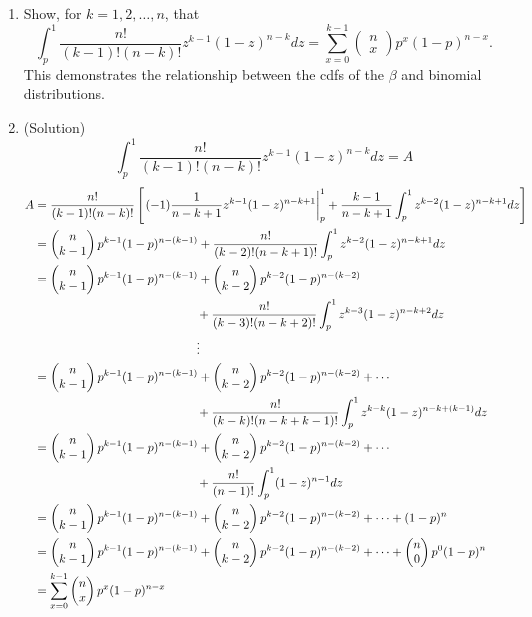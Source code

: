 \documentclass{oblivoir}
\newcommand{\mat}[2]{\begin{pmatrix} #1 \\ #2 \end{pmatrix}}
\begin{document}
\begin{enumerate}
\item
Show, for $k = 1,2,\ldots,n$, that
$$
\int_p^1 \frac{n!}{(k-1)! (n-k)!} z^{k-1} (1-z)^{n-k} dz = \sum_{x=0}^{k-1} \mat{n}{x} p^x(1-p)^{n-x}.
$$
This demonstrates the relationship between the cdfs of the $\beta$ and binomial distributions.

\item[] (Solution)
$$
\int_p^1 \frac{n!}{(k-1)! (n-k)!} z^{k-1} (1-z)^{n-k} dz = A
$$
\begin{align*}
A &= \frac{n!}{(k-1)! (n-k)!} \left[ \left. (-1) \frac{1}{n-k+1} z^{k-1} (1-z)^{n-k+1}\right \vert_{p}^{1} + \frac{k-1}{n-k+1} \int_p^1 z^{k-2} (1-z)^{n-k+1} dz \right] \\
&= \mat{n}{k-1} p^{k-1} (1-p)^{n-(k-1)} + \frac{n!}{(k-2)! (n-k+1)!} \int_p^1 z^{k-2} (1-z)^{n-k+1} dz \\
&= \mat{n}{k-1} p^{k-1} (1-p)^{n-(k-1)} + \mat{n}{k-2} p^{k-2} (1-p)^{n-(k-2)} \\
& \hphantom{{} + \mat{n}{k-2} p^{k-2} (1-p)^{n-(k-2)}} + \frac{n!}{(k-3)! (n-k+2)!} \int_p^1 z^{k-3} (1-z)^{n-k+2} dz \\
&\hphantom{{} +  \mat{n}{k-2} p^{k-2} (1-p)^{n-(k-2)}} \vdots\\
&= \mat{n}{k-1} p^{k-1} (1-p)^{n-(k-1)} + \mat{n}{k-2} p^{k-2} (1-p )^{n-(k-2)} + \cdots \\
& \hphantom{{} + \mat{n}{k-2} p^{k-2} (1-p)^{n-(k-2)}} + \frac{n!}{(k-k)!(n-k+k-1)!} \int_p^1 z^{k-k} (1-z)^{n-k+(k-1)}dz\\
&= \mat{n}{k-1} p^{k-1} (1-p)^{n-(k-1)} + \mat{n}{k-2} p^{k-2} (1-p )^{n-(k-2)} + \cdots \\
& \hphantom{{} + \mat{n}{k-2} p^{k-2} (1-p)^{n-(k-2)}} + \frac{n!}{(n-1)!} \int_p^1 (1-z)^{n-1}dz\\
&= \mat{n}{k-1} p^{k-1} (1-p)^{n-(k-1)} + \mat{n}{k-2} p^{k-2} (1-p )^{n-(k-2)} + \cdots + (1-p)^n\\
&= \mat{n}{k-1} p^{k-1} (1-p)^{n-(k-1)} + \mat{n}{k-2} p^{k-2} (1-p)^{n-(k-2)} + \cdots + \mat{n}{0} p^{0} (1-p)^{n} \\
&= \sum_{x=0}^{k-1} \mat{n}{x} p^x(1-p)^{n-x}
\end{align*}


\end{enumerate}
\end{document}
